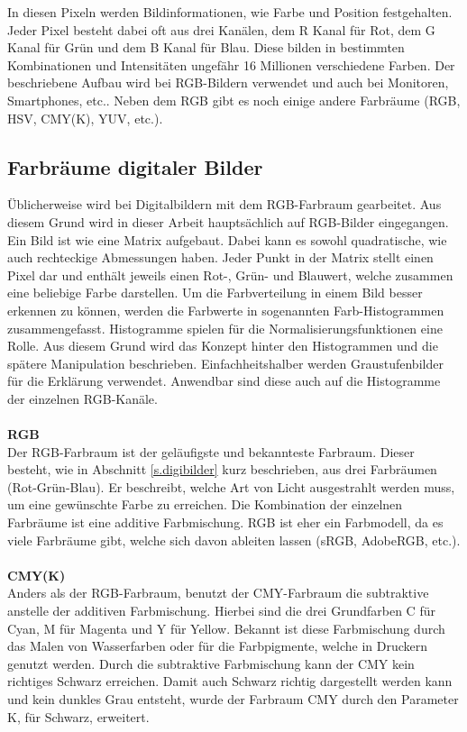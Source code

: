 In diesen Pixeln werden Bildinformationen, wie Farbe und Position festgehalten. Jeder Pixel besteht dabei oft aus drei Kanälen, dem R Kanal für Rot, dem G Kanal für Grün und dem B Kanal für Blau. Diese bilden in bestimmten Kombinationen und Intensitäten ungefähr 16 Millionen verschiedene Farben. Der beschriebene Aufbau wird bei RGB-Bildern verwendet und auch bei Monitoren, Smartphones, etc.. Neben dem RGB gibt es noch einige andere Farbräume (RGB, HSV, CMY(K), YUV, etc.).
\subsection{Farbräume digitaler Bilder}\label{s.aufbdigibilder}
Üblicherweise wird bei Digitalbildern mit dem RGB-Farbraum gearbeitet. Aus diesem Grund wird in dieser Arbeit hauptsächlich auf RGB-Bilder eingegangen. Ein Bild ist wie eine Matrix aufgebaut. Dabei kann es sowohl quadratische, wie auch rechteckige Abmessungen haben. Jeder Punkt in der Matrix stellt einen Pixel dar und enthält jeweils einen Rot-, Grün- und Blauwert, welche zusammen eine beliebige Farbe darstellen. Um die Farbverteilung in einem Bild besser erkennen zu können, werden die Farbwerte in sogenannten Farb-Histogrammen zusammengefasst. Histogramme spielen für die Normalisierungsfunktionen eine Rolle. Aus diesem Grund wird das Konzept hinter den Histogrammen und die spätere Manipulation beschrieben. Einfachheitshalber werden Graustufenbilder für die Erklärung verwendet. Anwendbar sind diese auch auf die Histogramme der einzelnen RGB-Kanäle.\\\\
\textbf{RGB}\label{s.rgb}\\
Der RGB-Farbraum ist der geläufigste und bekannteste Farbraum. Dieser besteht, wie in Abschnitt \ref{s.digibilder} kurz beschrieben, aus drei Farbräumen (Rot-Grün-Blau). Er beschreibt, welche Art von Licht ausgestrahlt werden muss, um eine gewünschte Farbe zu erreichen. Die Kombination der einzelnen Farbräume ist eine additive Farbmischung. RGB ist eher ein Farbmodell, da es viele Farbräume gibt, welche sich davon ableiten lassen (sRGB, AdobeRGB, etc.).\\\\
\textbf{CMY(K)}\label{s.cmy}\\
Anders als der RGB-Farbraum, benutzt der CMY-Farbraum die subtraktive anstelle der additiven Farbmischung. Hierbei sind die drei Grundfarben C für Cyan, M für Magenta und Y für Yellow. Bekannt ist diese Farbmischung durch das Malen von Wasserfarben oder für die Farbpigmente, welche in Druckern genutzt werden. Durch die subtraktive Farbmischung kann der CMY kein richtiges Schwarz erreichen. Damit auch Schwarz richtig dargestellt werden kann und kein dunkles Grau entsteht, wurde der Farbraum CMY durch den Parameter K, für Schwarz, erweitert.\\\\
